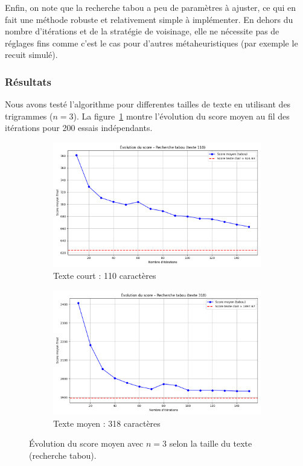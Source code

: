 \documentclass[a4paper]{article}
\begin{document}
\vspace{0.5em}

Enfin, on note que la recherche tabou a peu de paramètres à ajuster, ce qui en fait une méthode robuste et relativement simple à implémenter. En dehors du nombre d’itérations et de la stratégie de voisinage, elle ne nécessite pas de réglages fins comme c’est le cas pour d’autres métaheuristiques (par exemple le recuit simulé).


\subsubsection{Résultats}

Nous avons testé l’algorithme pour differentes tailles de texte en utilisant des trigrammes ($n = 3$). La figure~\ref{fig:tabou_taille} montre l’évolution du score moyen au fil des itérations pour 200 essais indépendants.

\begin{figure}[H]
    \centering
    \begin{subfigure}[b]{0.45\textwidth}
        \includegraphics[width=\textwidth]{courbe_tabou_110.png}
        \caption{Texte court : 110 caractères}
    \end{subfigure}
    \hfill
    \begin{subfigure}[b]{0.45\textwidth}
        \includegraphics[width=\textwidth]{courbe_tabou_318.png}
        \caption{Texte moyen : 318 caractères}
    \end{subfigure}
    \caption{Évolution du score moyen avec $n = 3$ selon la taille du texte (recherche tabou).}
    \label{fig:tabou_taille}
\end{figure}
\end{document}
